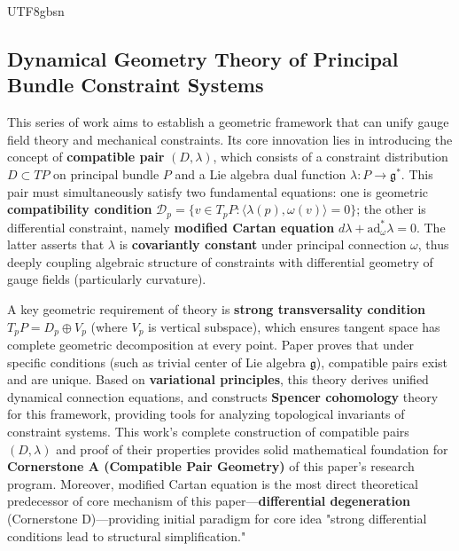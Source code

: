 \documentclass[a4paper,12pt]{extarticle}
\theoremstyle{definition}
\begin{document}
\begin{CJK}{UTF8}{gbsn}
\subsection{Dynamical Geometry Theory of Principal Bundle Constraint Systems \cite{zheng2025dynamical}}
\label{subsec:roadmap_dynamical}
This series of work \cite{zheng2025dynamical} aims to establish a geometric framework that can unify gauge field theory and mechanical constraints. Its core innovation lies in introducing the concept of \textbf{compatible pair} $(D, \lambda)$, which consists of a constraint distribution $D \subset TP$ on principal bundle $P$ and a Lie algebra dual function $\lambda: P \to \mathfrak{g}^*$. This pair must simultaneously satisfy two fundamental equations: one is geometric \textbf{compatibility condition} $\mathcal{D}_{p} = \{v \in T_{p}P : \langle\lambda(p), \omega(v)\rangle = 0\}$; the other is differential constraint, namely \textbf{modified Cartan equation} $d\lambda + \mathrm{ad}_{\omega}^{*}\lambda = 0$. The latter asserts that $\lambda$ is \textbf{covariantly constant} under principal connection $\omega$, thus deeply coupling algebraic structure of constraints with differential geometry of gauge fields (particularly curvature).

A key geometric requirement of theory is \textbf{strong transversality condition} $T_pP = D_p \oplus V_p$ (where $V_p$ is vertical subspace), which ensures tangent space has complete geometric decomposition at every point. Paper proves that under specific conditions (such as trivial center of Lie algebra $\mathfrak{g}$), compatible pairs exist and are unique. Based on \textbf{variational principles}, this theory derives unified dynamical connection equations, and constructs \textbf{Spencer cohomology} theory for this framework, providing tools for analyzing topological invariants of constraint systems. This work's complete construction of compatible pairs $(D, \lambda)$ and proof of their properties provides solid mathematical foundation for \textbf{Cornerstone A (Compatible Pair Geometry)} of this paper's research program. Moreover, modified Cartan equation is the most direct theoretical predecessor of core mechanism of this paper—\textbf{differential degeneration} (Cornerstone D)—providing initial paradigm for core idea "strong differential conditions lead to structural simplification."


\end{CJK}
\end{document}
